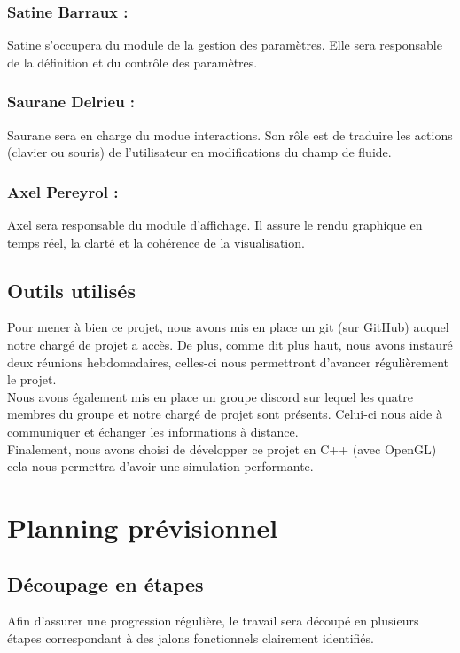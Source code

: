 \documentclass{article}
\begin{document}
   \subsubsection*{Satine Barraux :}
   Satine s'occupera du module de la gestion des paramètres. 
   Elle sera responsable de la définition et du contrôle des paramètres.

   \subsubsection*{Saurane Delrieu :}
   Saurane sera en charge du modue interactions. 
   Son rôle est de traduire les actions (clavier ou souris) de l'utilisateur 
   en modifications du champ de fluide.

   \subsubsection*{Axel Pereyrol :}
   Axel sera responsable du module d'affichage.
   Il assure le rendu graphique en temps réel, la clarté et la cohérence de la visualisation.
   
   

   \subsection{Outils utilisés}
   Pour mener à bien ce projet, nous avons mis en place un git (sur GitHub) auquel notre chargé de projet a accès.
   De plus, comme dit plus haut, nous avons instauré deux réunions hebdomadaires, celles-ci nous permettront d'avancer régulièrement le projet.\\
   Nous avons également mis en place un groupe discord sur lequel les quatre membres du groupe et notre chargé de projet sont présents. Celui-ci nous 
   aide à communiquer et échanger les informations à distance.\\
   Finalement, nous avons choisi de développer ce projet en C++ (avec OpenGL) cela nous permettra d'avoir une simulation performante.

   \section{Planning prévisionnel}
   
   \subsection{Découpage en étapes}
   Afin d’assurer une progression régulière, le travail sera découpé en plusieurs étapes correspondant à des jalons fonctionnels clairement identifiés.
\end{document}
